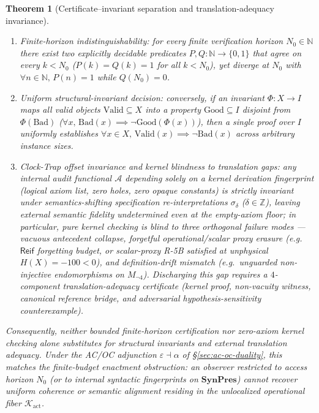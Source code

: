 \documentclass[11pt]{article}
\theoremstyle{plain}
\newtheorem{theorem}{Theorem}[section]
\theoremstyle{definition}
\begin{document}
\begin{theorem}[Certificate--invariant separation and translation-adequacy invariance]\label{thm:cert-inv-separation}
\begin{enumerate}[nosep,label=(\roman*)]
\item \emph{Finite-horizon indistinguishability}: for every finite verification horizon $N_0 \in \mathbb{N}$ there exist two explicitly decidable predicates $P, Q : \mathbb{N} \to \{0,1\}$ that agree on every $k < N_0$ ($P(k) = Q(k) = 1$ for all $k < N_0$), yet diverge at $N_0$ with $\forall n \in \mathbb{N},\, P(n) = 1$ while $Q(N_0) = 0$.
\item \emph{Uniform structural-invariant decision}: conversely, if an invariant $\Phi : X \to I$ maps all valid objects $\mathrm{Valid} \subseteq X$ into a property $\mathrm{Good} \subseteq I$ disjoint from $\Phi(\mathrm{Bad})$ ($\forall x,\, \mathrm{Bad}(x) \implies \neg\mathrm{Good}(\Phi(x))$), then a single proof over $I$ uniformly establishes $\forall x \in X,\, \mathrm{Valid}(x) \implies \neg\mathrm{Bad}(x)$ across arbitrary instance sizes.
\item \emph{Clock-Trap offset invariance and kernel blindness to translation gaps}: any internal audit functional $\mathcal{A}$ depending solely on a kernel derivation fingerprint (logical axiom list, zero holes, zero opaque constants) is strictly invariant under semantics-shifting specification re-interpretations $\sigma_\delta$ ($\delta \in \mathbb{Z}$), leaving external semantic fidelity undetermined even at the empty-axiom floor; in particular, pure kernel checking is blind to three orthogonal failure modes --- vacuous antecedent collapse, forgetful operational/scalar proxy erasure (e.g.\ $\mathsf{Reif}$ forgetting budget, or scalar-proxy R-5B satisfied at unphysical $H(X) = -100 < 0$), and definition-drift mismatch (e.g.\ unguarded non-injective endomorphisms on $M_{\neg 4}$). Discharging this gap requires a $4$-component \emph{translation-adequacy certificate} (kernel proof, non-vacuity witness, canonical reference bridge, and adversarial hypothesis-sensitivity counterexample).
\end{enumerate}
Consequently, neither bounded finite-horizon certification nor zero-axiom kernel checking alone substitutes for structural invariants and external translation adequacy. Under the AC/OC adjunction $\varepsilon \dashv \alpha$ of \S\ref{sec:ac-oc-duality}, this matches the finite-budget enactment obstruction: an observer restricted to access horizon $N_0$ (or to internal syntactic fingerprints on $\mathbf{SynPres}$) cannot recover uniform coherence or semantic alignment residing in the unlocalized operational fiber $\mathcal{K}_{\mathrm{act}}$.
\end{theorem}
\end{document}

